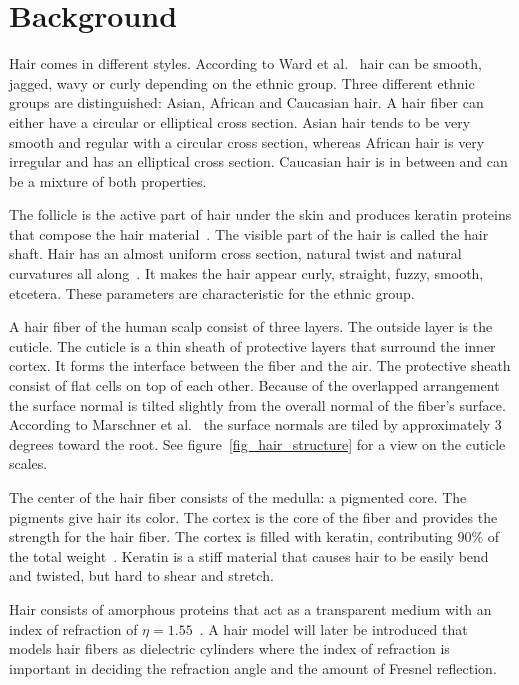 \documentclass[11pt,a4paper]{report}
\begin{document}
\chapter{Background}

Hair comes in different styles. According to Ward et al.~\cite{ward} hair can be smooth, jagged, wavy or curly depending on the ethnic group. Three different ethnic groups are distinguished: Asian, African and Caucasian hair. A hair fiber can either have a circular or elliptical cross section. Asian hair tends to be very smooth and regular with a circular cross section, whereas African hair is very irregular and has an elliptical cross section. Caucasian hair is in between and can be a mixture of both properties.

The follicle is the active part of hair under the skin and produces keratin proteins that compose the hair material~\cite{hadap}. The visible part of the hair is called the hair shaft. Hair has an almost uniform cross section, natural twist and natural curvatures all along~\cite{hadap}. It makes the hair appear curly, straight, fuzzy, smooth, etcetera. These parameters are characteristic for the ethnic group.

A hair fiber of the human scalp consist of three layers. The outside layer is the cuticle. The cuticle is a thin sheath of protective layers that surround the inner cortex. It forms the interface between the fiber and the air. The protective sheath consist of flat cells on top of each other. Because of the overlapped arrangement the surface normal is tilted slightly from the overall normal of the fiber's surface. According to Marschner et al.~\cite{marschner} the surface normals are tiled by approximately 3 degrees toward the root. See figure~\ref{fig_hair_structure} for a view on the cuticle scales.

The center of the hair fiber consists of the medulla: a pigmented core. The pigments give hair its color. The cortex is the core of the fiber and provides the strength for the hair fiber. The cortex is filled with keratin, contributing 90\% of the total weight~\cite{ward}. Keratin is a stiff material that causes hair to be easily bend and twisted, but hard to shear and stretch.

Hair consists of amorphous proteins that act as a transparent medium with an index of refraction of $\eta = 1.55$~\cite{ward}. A hair model will later be introduced that models hair fibers as dielectric cylinders where the index of refraction is important in deciding the refraction angle and the amount of Fresnel reflection.
\end{document}
